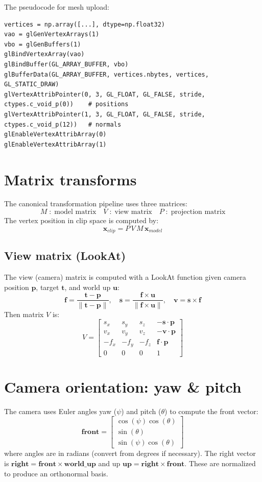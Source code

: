 \documentclass[12pt,a4paper]{report}
\begin{document}
The pseudocode for mesh upload:
\begin{lstlisting}[style=pycode,caption={Mesh upload pseudocode}]
vertices = np.array([...], dtype=np.float32)
vao = glGenVertexArrays(1)
vbo = glGenBuffers(1)
glBindVertexArray(vao)
glBindBuffer(GL_ARRAY_BUFFER, vbo)
glBufferData(GL_ARRAY_BUFFER, vertices.nbytes, vertices, GL_STATIC_DRAW)
glVertexAttribPointer(0, 3, GL_FLOAT, GL_FALSE, stride, ctypes.c_void_p(0))    # positions
glVertexAttribPointer(1, 3, GL_FLOAT, GL_FALSE, stride, ctypes.c_void_p(12))   # normals
glEnableVertexAttribArray(0)
glEnableVertexAttribArray(1)
\end{lstlisting}

\section{Matrix transforms}
The canonical transformation pipeline uses three matrices:
\[
  M \;:\; \text{model matrix} \quad
  V \;:\; \text{view matrix} \quad
  P \;:\; \text{projection matrix}
\]
The vertex position in clip space is computed by:
\[
  \mathbf{x}_{clip} = P \, V \, M \, \mathbf{x}_{model}
\]
\subsection{View matrix (LookAt)}
The view (camera) matrix is computed with a LookAt function given camera position \( \mathbf{p} \), target \( \mathbf{t} \), and world up \( \mathbf{u} \):
\[
  \mathbf{f} = \frac{\mathbf{t} - \mathbf{p}}{\|\mathbf{t}-\mathbf{p}\|},\quad
  \mathbf{s} = \frac{\mathbf{f} \times \mathbf{u}}{\|\mathbf{f}\times\mathbf{u}\|},\quad
  \mathbf{v} = \mathbf{s} \times \mathbf{f}
\]
Then matrix \(V\) is:
\[
  V = \begin{bmatrix}
  s_x & s_y & s_z & -\mathbf{s}\cdot\mathbf{p} \\
  v_x & v_y & v_z & -\mathbf{v}\cdot\mathbf{p} \\
 -f_x & -f_y & -f_z & \mathbf{f}\cdot\mathbf{p} \\
  0 & 0 & 0 & 1
  \end{bmatrix}
\]

\section{Camera orientation: yaw \& pitch}
The camera uses Euler angles yaw (\(\psi\)) and pitch (\(\theta\)) to compute the front vector:
\[
  \mathbf{front} = \begin{bmatrix}
    \cos(\psi)\cos(\theta) \\
    \sin(\theta) \\
    \sin(\psi)\cos(\theta)
  \end{bmatrix}
\]
where angles are in radians (convert from degrees if necessary).
The right vector is \( \mathbf{right} = \mathbf{front} \times \mathbf{world\_up} \) and up \( \mathbf{up} = \mathbf{right} \times \mathbf{front} \). These are normalized to produce an orthonormal basis.
\end{document}
